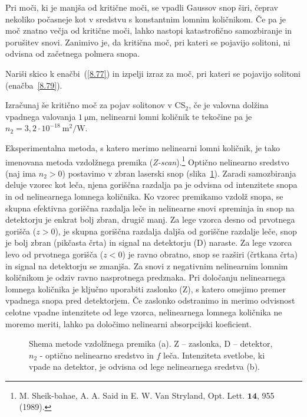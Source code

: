 Pri moči, ki je manjša od kritične moči, se vpadli Gaussov snop širi, 
čeprav nekoliko počasneje kot v sredstvu s konstantnim lomnim količnikom. 
Če pa je moč znatno večja od kritične moči, lahko
nastopi katastrofično samozbiranje in porušitev snovi.
Zanimivo je, da kritična moč, pri kateri se pojavijo solitoni, 
ni odvisna od začetnega polmera snopa.

\begin{definition}
Nariši skico k enačbi~(\ref{8.77}) in izpelji izraz za moč, pri kateri se pojavijo
solitoni (enačba~\ref{8.79}). 

Izračunaj še kritično moč za pojav solitonov v CS$_{2}$,
če je valovna dolžina vpadnega valovanja $1~\si{\micro\metre}$, 
nelinearni lomni količnik te tekočine pa je 
 $n_{2}=3,2 \cdot 10^{-18}~\si{\metre^2/\watt}$. 
\end{definition}
\pagebreak

\begin{remark}
Eksperimentalna metoda, 
s katero merimo nelinearni 
lomni količnik, je tako imenovana
metoda vzdolžnega premika ({\it Z-scan}).\footnote{M. Sheik-bahae, A. A. Said in E. W. Van Stryland, 
Opt. Lett. $\mathbf{14}$, 955 (1989).} 
Optično nelinearno sredstvo (naj ima $n_2>0$)
postavimo v zbran laserski snop (slika~\ref{fig:zscan}). 
Zaradi samozbiranja deluje vzorec kot leča, njena goriščna razdalja
pa je odvisna od intenzitete snopa in od nelinearnega lomnega količnika. Ko vzorec 
premikamo vzdolž snopa, se skupna efektivna goriščna razdalja leče in nelinearne snovi 
spreminja in snop na detektorju je enkrat bolj zbran, drugič manj. 
Za lege vzorca desno od prvotnega gorišča ($z>0$), je skupna goriščna
razdalja daljša od goriščne razdalje leče, snop je bolj zbran (pikčasta črta) in signal 
na detektorju (D) naraste. Za lege vzorca levo
od prvotnega gorišča ($z<0$) je ravno obratno, snop se razširi (črtkana črta) in 
signal na detektorju se zmanjša. Za snovi z negativnim nelinearnim lomnim količnikom
je odziv ravno nasprotnega predznaka. Pri določanju nelinearnega lomnega količnika je
ključno uporabiti zaslonko (Z), s katero omejimo premer vpadnega snopa pred detektorjem. 
Če zaslonko odstranimo in merimo 
odvisnost celotne vpadne intenzitete od lege vzorca, nelinearnega lomnega količnika 
ne moremo meriti, lahko pa določimo nelinearni absorpcijski koeficient. 

\begin{figure}[h!]
\raggedleft 
\def\svgwidth{130truemm} 

\caption{Shema metode vzdolžnega premika (a). Z -- zaslonka, D -- detektor, $n_2$ - optično
nelinearno sredstvo in $f$ leča. Intenziteta svetlobe, ki vpade na detektor, je odvisna
od lege nelinearnega sredstva (b).}
\label{fig:zscan}
\end{figure}
\end{remark}

